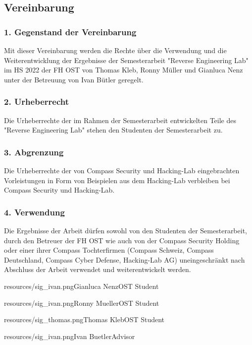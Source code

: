 \subsection*{Vereinbarung}
\subsubsection*{1. Gegenstand der Vereinbarung}
Mit dieser Vereinbarung werden die Rechte über die Verwendung und die Weiterentwicklung der Ergebnisse der Semesterarbeit "Reverse Engineering Lab" im HS 2022 der FH OST von Thomas Kleb, Ronny Müller und Gianluca Nenz unter der Betreuung von Ivan Bütler geregelt. \\

\vspace{-2ex}
\subsubsection*{2. Urheberrecht}
Die Urheberrechte der im Rahmen der Semesterarbeit entwickelten Teile des "Reverse Engineering Lab" stehen den Studenten der Semesterarbeit zu.\\

\vspace{-2ex}
\subsubsection*{3. Abgrenzung}
Die Urheberrechte der von Compass Security und Hacking-Lab eingebrachten Vorleistungen in Form von Beispielen aus dem Hacking-Lab verbleiben bei Compass Security und Hacking-Lab. \\

\vspace{-2ex}
\subsubsection*{4. Verwendung}
Die Ergebnisse der Arbeit dürfen sowohl von den Studenten der Semesterarbeit, durch den Betreuer der FH OST wie auch von der Compass Security Holding oder einer ihrer Compass Tochterfirmen (Compass Schweiz, Compass Deutschland, Compass Cyber Defense, Hacking-Lab AG) uneingeschränkt nach Abschluss der Arbeit verwendet und weiterentwickelt werden. \\

\vspace{-2ex}
\signature{0.75}{resources/sig_ivan.png}{Gianluca Nenz}{OST Student}\hfill\signature{0.75}{resources/sig_ivan.png}{Ronny Mueller}{OST Student}

\signature{0.2}{resources/sig_thomas.png}{Thomas Kleb}{OST Student}\hfill \signature{0.75}{resources/sig_ivan.png}{Ivan Buetler}{Advisor}

